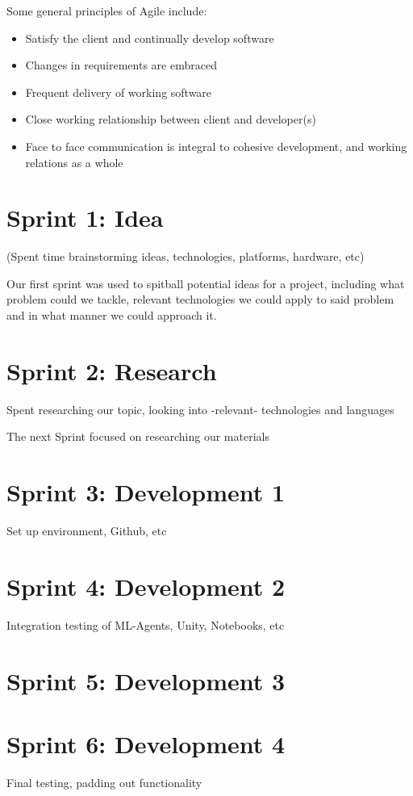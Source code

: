 Some general principles of Agile include:

\begin{itemize}
    \item{Satisfy the client and continually develop software}
    \item{Changes in requirements are embraced}
    \item{Frequent delivery of working software} 
    \item{Close working relationship between client and developer(s)}
    \item{Face to face communication is integral to cohesive development, and working relations as a whole}
\end{itemize}

\section{Sprint 1: Idea}
	(Spent time brainstorming ideas, technologies, platforms, hardware, etc)
	
	Our first sprint was used to spitball potential ideas for a project, including what problem could we tackle, relevant technologies we could apply to said problem and in what manner we could approach it. 
	
\section{Sprint 2: Research}
	Spent researching our topic, looking into -relevant- technologies and languages 
	
	The next Sprint focused on researching our materials

\section{Sprint 3: Development 1}
	Set up environment, Github, etc

\section{Sprint 4: Development 2}
	Integration testing of ML-Agents, Unity, Notebooks, etc

\section{Sprint 5: Development 3}

\section{Sprint 6: Development 4}
	Final testing, padding out functionality

